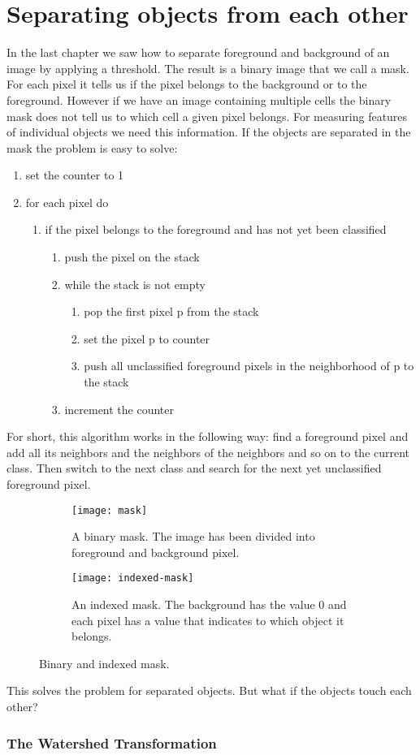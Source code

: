 \chapter{Separating objects from each other}

In the last chapter we saw how to separate foreground and background of an image by applying a threshold. The result is a binary image that we call a mask. For each pixel it tells us if the pixel belongs to the background or to the foreground. However if we have an image containing multiple cells the binary mask does not tell us to which cell a given pixel belongs. For measuring features of individual objects we need this information. If the objects are separated in the mask the problem is easy to solve:

\begin{enumerate}
\item set the counter to 1
\item for each pixel do
\begin{enumerate}
\item if the pixel belongs to the foreground and has not yet been classified
\begin{enumerate}
\item push the pixel on the stack
\item while the stack is not empty
\begin{enumerate}
\item pop the first pixel p from the stack
\item set the pixel p to counter
\item push all unclassified foreground pixels in the neighborhood of p to the stack
\end{enumerate}
\item increment the counter
\end{enumerate}
\end{enumerate}
\end{enumerate}

For short, this algorithm works in the following way: find a foreground pixel and add all its neighbors and the neighbors of the neighbors and so on to the current class. Then switch to the next class and search for the next yet unclassified foreground pixel.

\begin{figure}[h!]
  \centering
\begin{subfigure}[t]{0.30\textwidth}
\texttt{[image: mask]}
    \caption[binary mask]{A binary mask. The image has been divided into foreground and background pixel.}
    \label{binary-mask}
\end{subfigure}  
\begin{subfigure}[t]{0.30\textwidth}
\texttt{[image: indexed-mask]}
    \caption[indexed mask]{An indexed mask. The background has the value 0 and each pixel has a value that indicates to which object it belongs.}
    \label{indexed-mask}
\end{subfigure}
   \caption{Binary and indexed mask.}
   \label{binary-and-indexed-mask}
\end{figure}

This solves the problem for separated objects. But what if the objects touch each other? 

\subsection{The Watershed Transformation}


